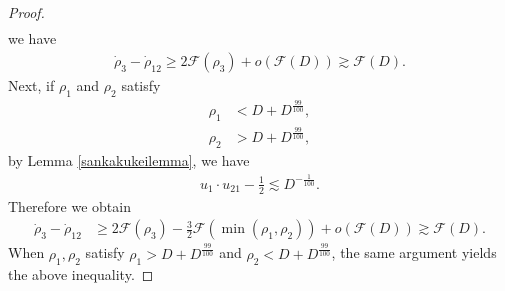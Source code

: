 \documentclass[10pt,a4paper]{amsart}
\begin{document}
\begin{proof}
\begin{align*}
\end{align*}
we have
\begin{align*}
\dot{\rho}_3-\dot{\rho}_{12}\geq 2\mathcal{F}(\rho_3)+o\left(\mathcal{F}(D)\right)\gtrsim \mathcal{F}(D).
\end{align*}
Next, if $\rho_1$ and $\rho_2$ satisfy 
\begin{align*}
\rho_1&<D+D^{\frac{99}{100}},
\\
\rho_2&>D+D^{\frac{99}{100}},
\end{align*}
by Lemma \ref{sankakukeilemma}, we have
\begin{align*}
u_1\cdot u_{21}-\frac{1}{2}\lesssim D^{-\frac{1}{100}}.
\end{align*}
Therefore we obtain
\begin{align*}
\dot{\rho}_3-\dot{\rho}_{12}&\geq 2\mathcal{F}(\rho_3)-\frac{3}{2}\mathcal{F}(\min{(\rho_1,\rho_2)})+o\left(\mathcal{F}(D)\right)\gtrsim \mathcal{F}(D).
\end{align*}
When $\rho_1, \rho_2$ satisfy $\rho_1>D+D^{\frac{99}{100}}$ and $\rho_2<D+D^{\frac{99}{100}}$, the same argument yields the above inequality.


\end{proof}
\end{document}
